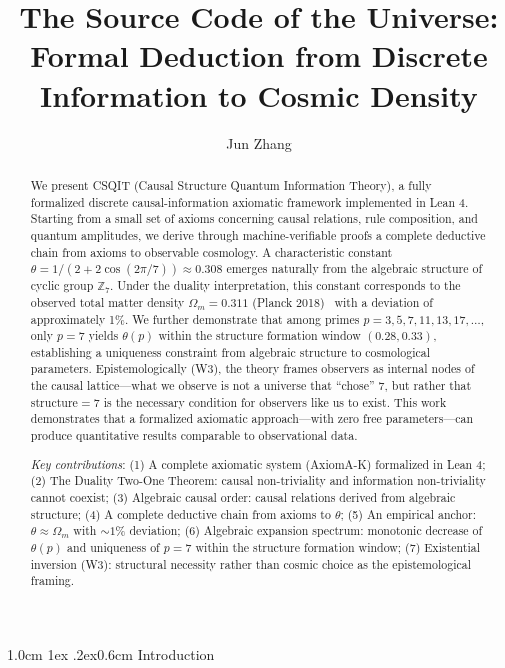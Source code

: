 \documentclass[aps,prd,twocolumn,nofootinbib,floatfix]{revtex4-2}
\title{The Source Code of the Universe: Formal Deduction from Discrete Information to Cosmic Density}
\author{Jun Zhang}
\affiliation{New Beginning Universe Research Group (Independent Researcher)}
\makeatletter
\def\section{%
  \@startsection{section}{1}{\z@}
    {1.0cm \@plus1ex \@minus .2ex}{0.6cm}
    {\normalfont\large\bfseries\centering}%
}
\makeatother
\begin{document}
\begin{abstract}
We present CSQIT (Causal Structure Quantum Information Theory), a fully formalized discrete causal-information axiomatic framework implemented in Lean 4. Starting from a small set of axioms concerning causal relations, rule composition, and quantum amplitudes, we derive through machine-verifiable proofs a complete deductive chain from axioms to observable cosmology. A characteristic constant $\theta = 1/(2+2\cos(2\pi/7)) \approx 0.308$ emerges naturally from the algebraic structure of cyclic group $\mathbb{Z}_7$. Under the duality interpretation, this constant corresponds to the observed total matter density $\Omega_m = 0.311$ (Planck 2018)~\cite{Planck2018} with a deviation of approximately 1\%. We further demonstrate that among primes $p=3,5,7,11,13,17,\ldots$, only $p=7$ yields $\theta(p)$ within the structure formation window $(0.28, 0.33)$, establishing a uniqueness constraint from algebraic structure to cosmological parameters. Epistemologically (W3), the theory frames observers as internal nodes of the causal lattice---what we observe is not a universe that ``chose'' 7, but rather that structure$=7$ is the necessary condition for observers like us to exist. This work demonstrates that a formalized axiomatic approach---with zero free parameters---can produce quantitative results comparable to observational data.

\textit{Key contributions}: (1) A complete axiomatic system (AxiomA-K) formalized in Lean 4; (2) The Duality Two-One Theorem: causal non-triviality and information non-triviality cannot coexist; (3) Algebraic causal order: causal relations derived from algebraic structure; (4) A complete deductive chain from axioms to $\theta$; (5) An empirical anchor: $\theta \approx \Omega_m$ with $\sim 1\%$ deviation; (6) Algebraic expansion spectrum: monotonic decrease of $\theta(p)$ and uniqueness of $p=7$ within the structure formation window; (7) Existential inversion (W3): structural necessity rather than cosmic choice as the epistemological framing.
\end{abstract}


\maketitle

\section{Introduction}
\end{document}
